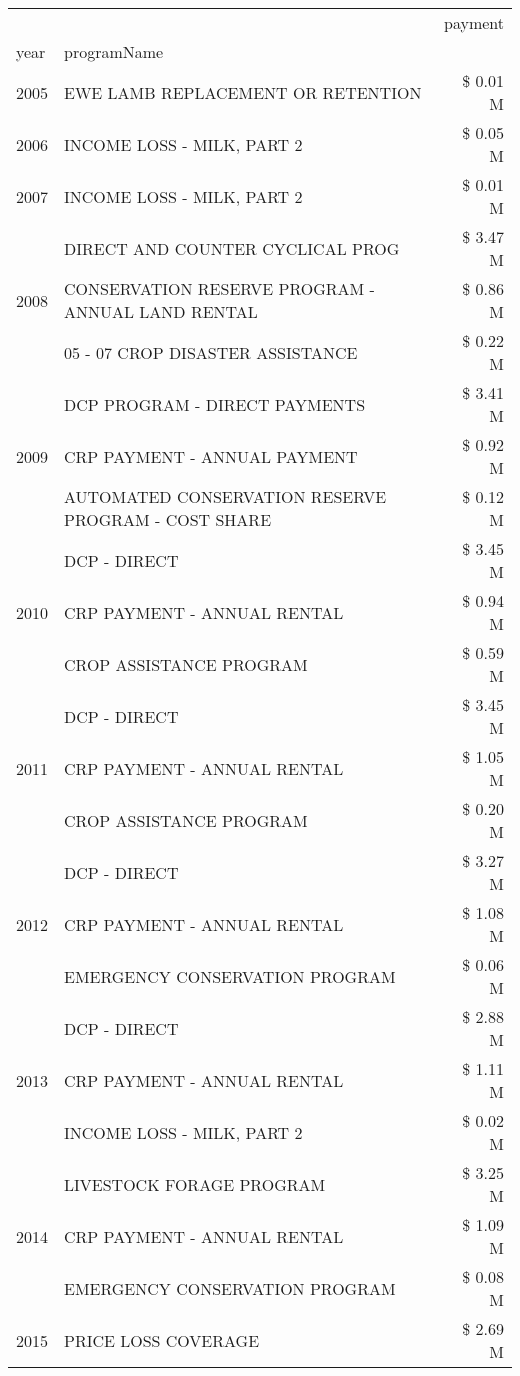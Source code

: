 \begin{tabular}{llr}
\toprule
 &  & payment \\
year & programName &  \\
\midrule
2005 & EWE LAMB REPLACEMENT OR RETENTION & \$ 0.01 M \\
\cline{1-3}
2006 & INCOME LOSS - MILK, PART 2 & \$ 0.05 M \\
\cline{1-3}
2007 & INCOME LOSS - MILK, PART 2 & \$ 0.01 M \\
\cline{1-3}
\multirow[t]{3}{*}{2008} & DIRECT AND COUNTER CYCLICAL PROG & \$ 3.47 M \\
 & CONSERVATION RESERVE PROGRAM - ANNUAL LAND RENTAL & \$ 0.86 M \\
 & 05 - 07 CROP DISASTER ASSISTANCE & \$ 0.22 M \\
\cline{1-3}
\multirow[t]{3}{*}{2009} & DCP PROGRAM - DIRECT PAYMENTS & \$ 3.41 M \\
 & CRP PAYMENT - ANNUAL PAYMENT & \$ 0.92 M \\
 & AUTOMATED CONSERVATION RESERVE PROGRAM - COST SHARE & \$ 0.12 M \\
\cline{1-3}
\multirow[t]{3}{*}{2010} & DCP - DIRECT & \$ 3.45 M \\
 & CRP PAYMENT - ANNUAL RENTAL & \$ 0.94 M \\
 & CROP ASSISTANCE PROGRAM & \$ 0.59 M \\
\cline{1-3}
\multirow[t]{3}{*}{2011} & DCP - DIRECT & \$ 3.45 M \\
 & CRP PAYMENT - ANNUAL RENTAL & \$ 1.05 M \\
 & CROP ASSISTANCE PROGRAM & \$ 0.20 M \\
\cline{1-3}
\multirow[t]{3}{*}{2012} & DCP - DIRECT & \$ 3.27 M \\
 & CRP PAYMENT - ANNUAL RENTAL & \$ 1.08 M \\
 & EMERGENCY CONSERVATION PROGRAM & \$ 0.06 M \\
\cline{1-3}
\multirow[t]{3}{*}{2013} & DCP - DIRECT & \$ 2.88 M \\
 & CRP PAYMENT - ANNUAL RENTAL & \$ 1.11 M \\
 & INCOME LOSS - MILK, PART 2 & \$ 0.02 M \\
\cline{1-3}
\multirow[t]{3}{*}{2014} & LIVESTOCK FORAGE PROGRAM & \$ 3.25 M \\
 & CRP PAYMENT - ANNUAL RENTAL & \$ 1.09 M \\
 & EMERGENCY CONSERVATION PROGRAM & \$ 0.08 M \\
\cline{1-3}
\multirow[t]{3}{*}{2015} & PRICE LOSS COVERAGE & \$ 2.69 M \\

\end{tabular}
